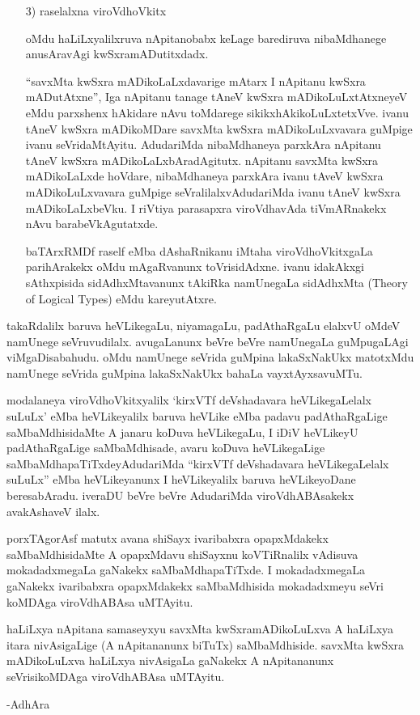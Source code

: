 \begin{itemize}
\item[{\rm 3)}] raselalxna viroVdhoVkitx

oMdu haLiLxyalilxruva nApitanobabx keLage barediruva nibaMdhanege anusAra\-vAgi kwSxramADutitxdadx.

``savxMta kwSxra mADikoLaLxdavarige mAtarx I nApitanu kwSxra mADutAtxne'', Iga nApitanu tanage tAneV kwSxra mADikoLuLxtAtxneyeV eMdu parxshenx hAkidare nAvu toMdarege sikikxhAkikoLuLxtetxVve. ivanu tAneV kwSxra mADikoMDare savxMta kwSxra mADikoLuLxvavara guMpige ivanu seVridaMtAyitu. AdudariMda nibaMdhaneya parxkAra nApitanu tAneV kwSxra mADikoLaLxbAradAgitutx. nApitanu savxMta kwSxra mADikoLaLxde hoVdare, nibaMdhaneya parxkAra ivanu tAveV kwSxra mADikoLuLxvavara guMpige seVralilalxvAdudariMda ivanu tAneV kwSxra mADikoLaLxbeVku. I riVtiya parasapxra viroVdhavAda tiVmARnakekx nAvu barabeVkAgutatxde.

baTArxRMDf raself eMba dAshaRnikanu iMtaha viroVdhoVkitxgaLa parihArakekx oMdu mAgaRvanunx toVrisidAdxne. ivanu idakAkxgi sAthxpisida sidAdhxMtavanunx tAkiRka namUnegaLa sidAdhxMta {\rm (Theory of Logical Types)} eMdu kareyutAtxre.
\end{itemize}

takaRdalilx baruva heVLikegaLu, niyamagaLu, padAthaRgaLu elalxvU oMdeV namUnege seVruvudilalx. avugaLanunx beVre beVre namUnegaLa guMpugaLAgi viMgaDisa\-bahudu. oMdu namUnege seVrida guMpina lakaSxNakUkx matotxMdu namUnege seVrida guMpina lakaSxNakUkx bahaLa vayxtAyxsavuMTu.

modalaneya viroVdhoVkitxyalilx `kirxVTf deVshadavara heVLikegaLelalx suLuLx' eMba heVLikeyalilx baruva heVLike eMba padavu padAthaRgaLige saMbaMdhisidaMte A janaru koDuva heVLikegaLu, I iDiV heVLikeyU padAthaRgaLige saMbaMdhisade, avaru koDuva heVLikegaLige saMbaMdhapaTiTxdeyAdudariMda ``kirxVTf deVshadavara heVLikegaLelalx suLuLx'' eMba heVLikeyanunx I heVLikeyalilx baruva heVLikeyoDane beresabAradu. iveraDU beVre beVre AdudariMda viroVdhABAsakekx avakAshaveV ilalx.

porxTAgorAsf matutx avana shiSayx ivaribabxra opapxMdakekx saMbaMdhisidaMte A opapxMdavu shiSayxnu koVTiRnalilx vAdisuva mokadadxmegaLa gaNakekx saMbaMdhapaTiTxde. I mokadadxmegaLa gaNakekx ivaribabxra opapxMdakekx saMbaMdhisida mokadadxmeyu seVri koMDAga viroVdhABAsa uMTAyitu.

haLiLxya nApitana samaseyxyu savxMta kwSxramADikoLuLxva A haLiLxya itara nivAsigaLige (A nApitananunx biTuTx) saMbaMdhiside. savxMta kwSxra mADikoLuLxva haLiLxya nivAsigaLa gaNakekx A nApitananunx seVrisikoMDAga viroVdhABAsa uMTAyitu.

\hfill{-AdhAra}


